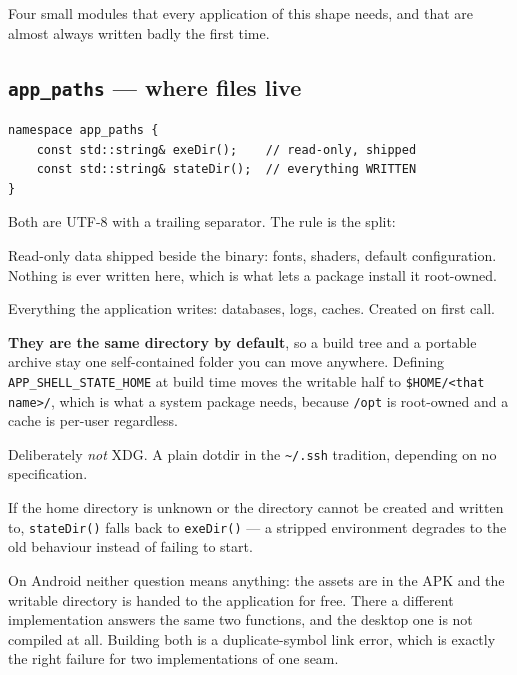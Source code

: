 \documentclass[11pt,a4paper]{article}
\begin{document}
Four small modules that every application of this shape needs, and that are
almost always written badly the first time.

\subsection{\texttt{app\_paths} --- where files live}

\begin{lstlisting}
namespace app_paths {
    const std::string& exeDir();    // read-only, shipped
    const std::string& stateDir();  // everything WRITTEN
}
\end{lstlisting}

Both are UTF-8 with a trailing separator. The rule is the split:

\begin{description}[leftmargin=1.5em]
\item[\texttt{exeDir()}] Read-only data shipped beside the binary: fonts,
  shaders, default configuration. Nothing is ever written here, which is what
  lets a package install it root-owned.
\item[\texttt{stateDir()}] Everything the application writes: databases, logs,
  caches. Created on first call.
\end{description}

\textbf{They are the same directory by default}, so a build tree and a portable
archive stay one self-contained folder you can move anywhere. Defining
\texttt{APP\_SHELL\_STATE\_HOME} at build time moves the writable half to
\texttt{\$HOME/<that name>/}, which is what a system package needs, because
\texttt{/opt} is root-owned and a cache is per-user regardless.

Deliberately \emph{not} XDG. A plain dotdir in the \texttt{\textasciitilde/.ssh}
tradition, depending on no specification.

If the home directory is unknown or the directory cannot be created and written
to, \texttt{stateDir()} falls back to \texttt{exeDir()} --- a stripped
environment degrades to the old behaviour instead of failing to start.

On Android neither question means anything: the assets are in the APK and the
writable directory is handed to the application for free. There a different
implementation answers the same two functions, and the desktop one is not
compiled at all. Building both is a duplicate-symbol link error, which is
exactly the right failure for two implementations of one seam.
\end{document}
